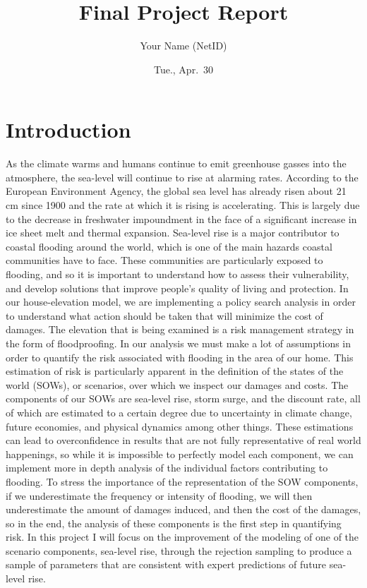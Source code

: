 \documentclass[
  11pt,
]{article}
\title{Final Project Report}
\author{Your Name (NetID)}
\date{Tue., Apr.~30}
\begin{document}
\maketitle

\section{Introduction}\label{introduction}

As the climate warms and humans continue to emit greenhouse gasses into
the atmosphere, the sea-level will continue to rise at alarming rates.
According to the European Environment Agency, the global sea level has
already risen about 21 cm since 1900 and the rate at which it is rising
is accelerating. This is largely due to the decrease in freshwater
impoundment in the face of a significant increase in ice sheet melt and
thermal expansion. Sea-level rise is a major contributor to coastal
flooding around the world, which is one of the main hazards coastal
communities have to face. These communities are particularly exposed to
flooding, and so it is important to understand how to assess their
vulnerability, and develop solutions that improve people's quality of
living and protection. In our house-elevation model, we are implementing
a policy search analysis in order to understand what action should be
taken that will minimize the cost of damages. The elevation that is
being examined is a risk management strategy in the form of
floodproofing. In our analysis we must make a lot of assumptions in
order to quantify the risk associated with flooding in the area of our
home. This estimation of risk is particularly apparent in the definition
of the states of the world (SOWs), or scenarios, over which we inspect
our damages and costs. The components of our SOWs are sea-level rise,
storm surge, and the discount rate, all of which are estimated to a
certain degree due to uncertainty in climate change, future economies,
and physical dynamics among other things. These estimations can lead to
overconfidence in results that are not fully representative of real
world happenings, so while it is impossible to perfectly model each
component, we can implement more in depth analysis of the individual
factors contributing to flooding. To stress the importance of the
representation of the SOW components, if we underestimate the frequency
or intensity of flooding, we will then underestimate the amount of
damages induced, and then the cost of the damages, so in the end, the
analysis of these components is the first step in quantifying risk. In
this project I will focus on the improvement of the modeling of one of
the scenario components, sea-level rise, through the rejection sampling
to produce a sample of parameters that are consistent with expert
predictions of future sea-level rise.
\end{document}
